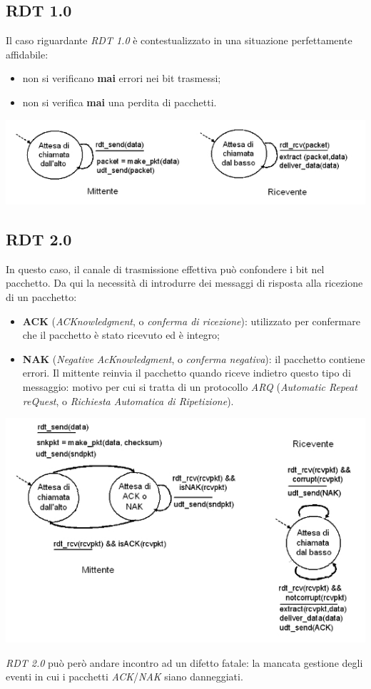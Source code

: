 \subsection{RDT 1.0}
Il caso riguardante \textit{RDT 1.0} è contestualizzato in una situazione perfettamente affidabile:
\begin{itemize}
    \item non si verificano \textbf{mai} errori nei bit trasmessi;
    \item non si verifica \textbf{mai} una perdita di pacchetti.
\end{itemize}
\begin{center}
    \includegraphics[width=.7\textwidth]{res/fsm-rdt-10.jpg} \hfill
\end{center}
\newpage

\subsection{RDT 2.0}
In questo caso, il canale di trasmissione effettiva può confondere i bit nel pacchetto. Da qui la necessità di introdurre dei messaggi di risposta alla ricezione di un pacchetto:
\begin{itemize}
    \item \textbf{ACK} (\textit{ACKnowledgment}, o \textit{conferma di ricezione}): utilizzato per confermare che il pacchetto è stato ricevuto ed è integro;
    \item \textbf{NAK} (\textit{Negative AcKnowledgment}, o \textit{conferma negativa}): il pacchetto contiene errori. Il mittente reinvia il pacchetto quando riceve indietro questo tipo di messaggio: motivo per cui si tratta di un protocollo \textit{ARQ} (\textit{Automatic Repeat reQuest}, o \textit{Richiesta Automatica di Ripetizione}).
\end{itemize}
\begin{center}
    \includegraphics[width=.7\textwidth]{res/fsm-rdt-20.jpg} \hfill
\end{center}
\textit{RDT 2.0} può però andare incontro ad un difetto fatale: la mancata gestione degli eventi in cui i pacchetti \textit{ACK}/\textit{NAK} siano danneggiati.

